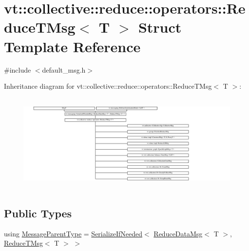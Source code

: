 \hypertarget{structvt_1_1collective_1_1reduce_1_1operators_1_1_reduce_t_msg}{}\section{vt\+:\+:collective\+:\+:reduce\+:\+:operators\+:\+:Reduce\+T\+Msg$<$ T $>$ Struct Template Reference}
\label{structvt_1_1collective_1_1reduce_1_1operators_1_1_reduce_t_msg}


{\ttfamily \#include $<$default\+\_\+msg.\+h$>$}

Inheritance diagram for vt\+:\+:collective\+:\+:reduce\+:\+:operators\+:\+:Reduce\+T\+Msg$<$ T $>$\+:\begin{figure}[H]
\begin{center}
\leavevmode
\includegraphics[height=4.982888cm]{structvt_1_1collective_1_1reduce_1_1operators_1_1_reduce_t_msg}
\end{center}
\end{figure}
\subsection*{Public Types}
\begin{DoxyCompactItemize}
\item 
using \hyperlink{structvt_1_1collective_1_1reduce_1_1operators_1_1_reduce_t_msg_a0dd12197060e03bb7e73dbe299044f22}{Message\+Parent\+Type} = \hyperlink{namespacevt_a0a4ad8c256fcffa564e9fa7800e4b495}{Serialize\+If\+Needed}$<$ \hyperlink{structvt_1_1collective_1_1reduce_1_1operators_1_1_reduce_data_msg}{Reduce\+Data\+Msg}$<$ T $>$, \hyperlink{structvt_1_1collective_1_1reduce_1_1operators_1_1_reduce_t_msg}{Reduce\+T\+Msg}$<$ T $>$ $>$
\end{DoxyCompactItemize}
